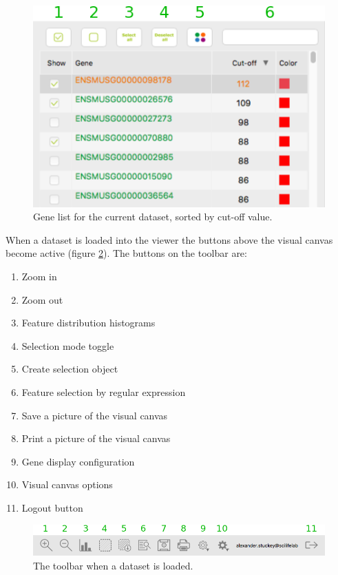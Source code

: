 \documentclass[10pt,a4paper,titlepage]{book}
\begin{document}
\begin{figure}[h]
	\centering
	\includegraphics[scale=0.7]{./Pictures/gene_list}
	\caption[Gene List]{Gene list for the current dataset, sorted by cut-off value.}
	\label{fig:gene_list}
\end{figure}

When a dataset is loaded into the viewer the buttons above the visual canvas become active (figure \ref{fig:toolbar_data_loaded}). The buttons on the toolbar are:
\begin{enumerate}
\item	Zoom in
\item	Zoom out
\item	Feature distribution histograms
\item	Selection mode toggle
\item	Create selection object
\item	Feature selection by regular expression
\item	Save a picture of the visual canvas
\item	Print a picture of the visual canvas
\item	Gene display configuration
\item	Visual canvas options
\item	Logout button
\end{enumerate}

\begin{figure}[h]
	\centering
	\includegraphics[width=0.9\linewidth]{./Pictures/toolbar_data_loaded}
	\caption{The toolbar when a dataset is loaded.}
	\label{fig:toolbar_data_loaded}
\end{figure}
\end{document}
